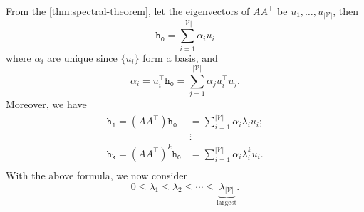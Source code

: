 From the \autoref{thm:spectral-theorem}, let the \hyperref[def:eigenvector]{eigenvectors} of \(A A^{\top} \) be \(u_1, \dots , u_{\left\vert \mathcal{V} \right\vert } \), then
\[
	\mathtt{h_0} = \sum\limits_{i=1}^{\left\vert \mathcal{V} \right\vert } \alpha_i u_{i}
\]
where \(\alpha_{i}\) are unique since \(\{u_{i}\} \) form a basis, and
\[
	\alpha_{i} = u_{i}^{\top}\mathtt{h_0} = \sum\limits_{j=1}^{\left\vert \mathcal{V} \right\vert } \alpha_{j}u_{i}^{\top}u_{j}.
\]
Moreover, we have
\[
	\begin{split}
		\mathtt{h_1} = (A A^{\top})\mathtt{h_0} &= \sum\limits_{i=1}^{\left\vert \mathcal{V} \right\vert } \alpha_{i} \lambda_{i}u_{i};\\
		&\vdots\\
		\mathtt{h_k} = (A A^{\top})^k\mathtt{h_0} &= \sum\limits_{i=1}^{\left\vert \mathcal{V} \right\vert } \alpha_{i} \lambda_{i}^k u_{i}.\\
	\end{split}
\]
With the above formula, we now consider
\[
	0 \leq \lambda_1 \leq \lambda_2 \leq \cdots \leq \underbrace{\lambda_{\left\vert \mathcal{V} \right\vert}}_{\text{largest}}.
\]
